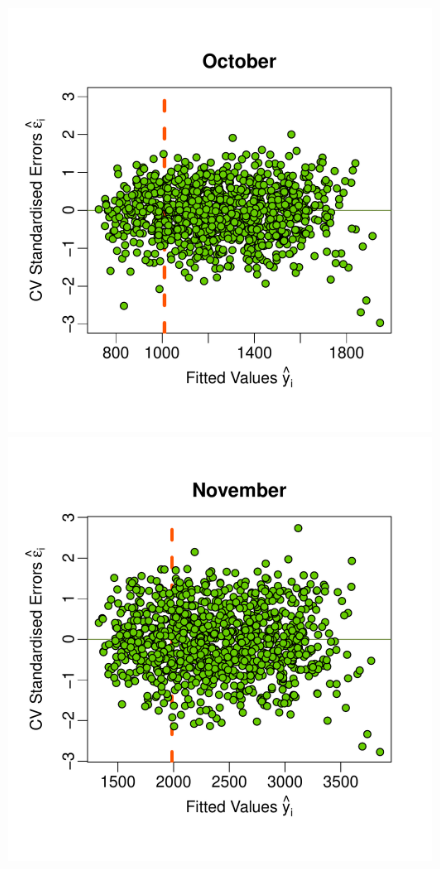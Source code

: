 \documentclass[a4paper, 12pt]{article}
\begin{document}
\begin{figure}
 \includegraphics[width=\scale]{Emulator_CV/ScatterPlots/October_CV_Scatter}\hspace{-1ex}
 \includegraphics[width=\scale]{Emulator_CV/ScatterPlots/November_CV_Scatter}\hspace{-1ex}

\end{figure}
\end{document}
